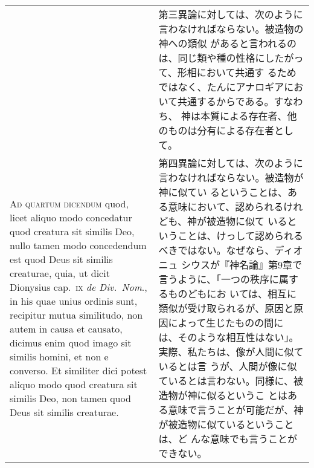 \documentclass[10pt]{jsarticle}
\begin{document}
\begin{longtable}{p{21em}p{21em}}
&

第三異論に対しては、次のように言わなければならない。被造物の神への類似
があると言われるのは、同じ類や種の性格にしたがって、形相において共通す
るためではなく、たんにアナロギアにおいて共通するからである。すなわち、
神は本質による存在者、他のものは分有による存在者として。

\\

{\scshape Ad quartum dicendum} quod, licet aliquo modo concedatur quod
creatura sit similis Deo, nullo tamen modo concedendum est quod Deus
sit similis creaturae, quia, ut dicit Dionysius cap.~{\scshape ix}
{\itshape de Div.~Nom}., in his quae unius ordinis sunt, recipitur
mutua similitudo, non autem in causa et causato, dicimus enim quod
imago sit similis homini, et non e converso. Et similiter dici potest
aliquo modo quod creatura sit similis Deo, non tamen quod Deus sit
similis creaturae.  


&

第四異論に対しては、次のように言わなければならない。被造物が神に似てい
るということは、ある意味において、認められるけれども、神が被造物に似て
いるということは、けっして認められるべきではない。なぜなら、ディオニュ
シウスが『神名論』第9章で言うように、「一つの秩序に属するものどもにお
いては、相互に類似が受け取られるが、原因と原因によって生じたものの間に
は、そのような相互性はない」。実際、私たちは、像が人間に似ているとは言
うが、人間が像に似ているとは言わない。同様に、被造物が神に似るというこ
とはある意味で言うことが可能だが、神が被造物に似ているということは、ど
んな意味でも言うことができない。

\end{longtable}
\end{document}
